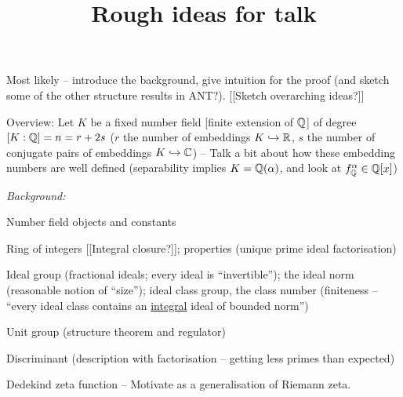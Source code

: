 \documentclass[11pt]{article}
\title{Rough ideas for talk}
\begin{document}
\maketitle
Most likely -- introduce the background, give intuition for the proof (and sketch some of the other structure results in ANT?). [[Sketch overarching ideas?]]

Overview: Let $K$ be a fixed number field [finite extension of $\mathbb{Q}$] of degree $[K : \mathbb{Q}] = n = r + 2s$ ($r$ the number of embeddings $K \hookrightarrow \mathbb{R}$, $s$ the number of conjugate pairs of embeddings $K \hookrightarrow \mathbb{C}$) -- Talk a bit about how these embedding numbers are well defined (separability implies $K = \mathbb{Q}(\alpha)$, and look at $f_{\mathbb{Q}}^\alpha \in \mathbb{Q}[x]$)
\begin{enum}
    \item \emph{Background:}
    \begin{enum2}
        \item Number field objects and constants
        \begin{enum2}
            \item Ring of integers [[Integral closure?]]; properties (unique prime ideal factorisation)
            \item Ideal group (fractional ideals; every ideal is ``invertible''); the ideal norm (reasonable notion of ``size''); ideal class group, the class number (finiteness -- ``every ideal class contains an \underline{integral} ideal of bounded norm'')
            \item Unit group (structure theorem and regulator)
            \item Discriminant (description with factorisation -- getting less primes than expected)
        \end{enum2}
    \item Dedekind zeta function -- Motivate as a generalisation of Riemann zeta.
    \end{enum2}
\end{enum}
\end{document}
